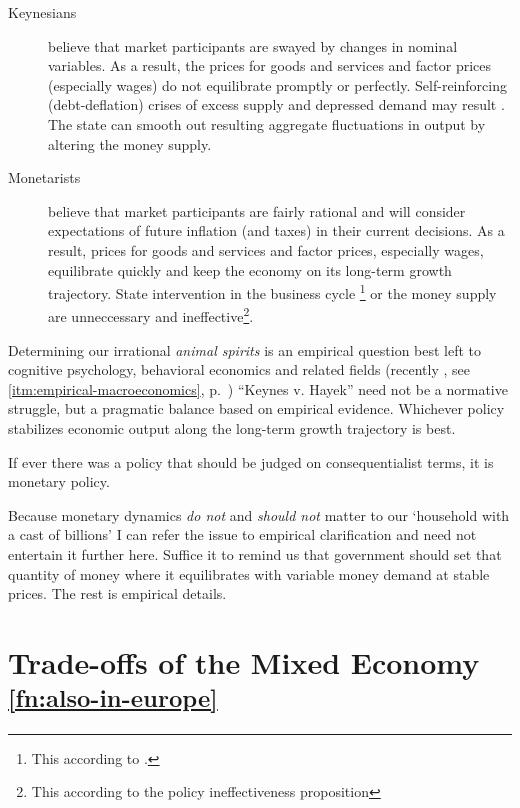 \begin{enumerate}
	\begin{description}
		\item[Keynesians] believe that market participants are swayed by changes in nominal variables. As a result, the prices for goods and services and factor prices (especially wages) do not equilibrate promptly or perfectly. Self-reinforcing (debt-deflation) crises of excess supply and depressed demand may result \citep{Fisher1933}. The state can smooth out resulting aggregate fluctuations in output by altering the money supply. 
		\item[Monetarists] believe that market participants are fairly rational and will consider expectations of future inflation (and taxes) in their current decisions. As a result, prices for goods and services and factor prices, especially wages, equilibrate quickly and keep the economy on its long-term growth trajectory. State intervention in the business cycle
		\footnote{
			This according to .
		} 
		or the money supply are unneccessary and ineffective\footnote{
			This according to the policy ineffectiveness proposition}.
	\end{description}

	Determining our irrational \emph{animal spirits} \citep{Keynes1936} is an empirical question best left to cognitive psychology, behavioral economics and related fields (recently \citealt{Akerlof2010}, see \autoref{itm:empirical-macroeconomics}, p.~\pageref{itm:empirical-macroeconomics})	
	``Keynes v. Hayek'' \citep{Wapshott2011} need not be a normative struggle, but a pragmatic balance based on empirical evidence. 
	Whichever policy stabilizes economic output along the long-term growth trajectory is best. 
	
	If ever there was a policy that should be judged on consequentialist terms, it is monetary policy.
\end{enumerate}

Because monetary dynamics \emph{do not} and \emph{should not} matter to our `household with a cast of billions' I can refer the issue to empirical clarification and need not entertain it further here. Suffice it to remind us that government should set that quantity of money where it equilibrates with variable money demand at stable prices. The rest is empirical details.

\section[trade-offs]{Trade-offs of the Mixed Economy \textsuperscript{\ref{fn:also-in-europe}}} \label{sec:trade-offs} 

